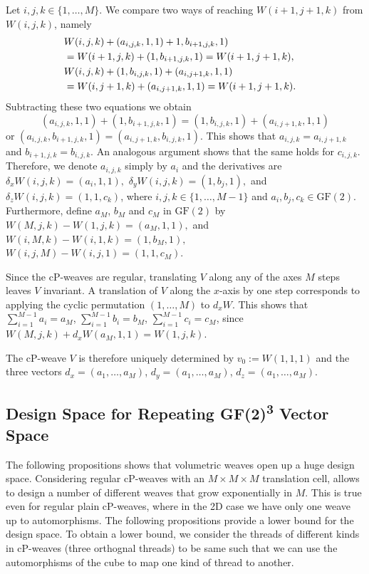 \documentclass[unnumsec,webpdf,contemporary,large]{oup-authoring-template}%
\theoremstyle{thmstyleone}%
\theoremstyle{thmstyletwo}%
\theoremstyle{thmstylethree}%
\newcommand{\GF}{{\mathrm{GF}}}
\begin{document}
Let $i,j,k\in\{1,\ldots, M\}$. We compare two ways of reaching  $W(i+1,j+1,k)$  from $W(i,j,k)$, namely
\begin{eqnarray*}
\lefteqn{W(i,j,k) + (a_{i,j,k},1,1)+ 1,b_{i+1,j,k},1) }\\
&= W(i+1,j,k) + (1,b_{i+1,j,k},1) = W(i+1,j+1,k),\\
\lefteqn{W(i,j,k) + (1,b_{i,j,k},1)+ (a_{i,j+1,k},1,1)}\\
&= W(i,j+1,k)+  (a_{i,j+1,k},1,1) = W(i+1,j+1,k).
\end{eqnarray*}
Subtracting these two equations we obtain 
$$(a_{i,j,k},1,1)+ (1,b_{i+1,j,k},1)  = 
(1,b_{i,j,k},1)+ (a_{i,j+1,k},1,1)$$
or $(a_{i,j,k},b_{i+1,j,k},1)  = (a_{i,j+1,k},b_{i,j,k},1).$
This shows that $a_{i,j,k}=a_{i,j+1,k}$ and $b_{i+1,j,k}=b_{i,j,k}.$ An analogous argument shows that the same holds for $c_{i,j,k}$.
Therefore, we denote $a_{i,j,k}$ simply by $a_i$
and the derivatives are  $\delta_x W(i,j,k) = (a_{i},1,1),$ $\delta_y W(i,j,k) = (1,b_{j},1),$ and $\delta_z W(i,j,k) = (1,1,c_{k})$, where $i,j,k\in \{1,\ldots, M-1\}$ and $a_i,b_j,c_k\in \GF(2)$. Furthermore, define $a_M$, $b_M$ and $c_M$ in $\GF(2)$ by $W(M,j,k) - W(1,j,k)= (a_M,1,1),$ and $W(i,M,k) - W(i,1,k)= (1,b_M,1),$ $W(i,j,M) - W(i,j,1)= (1,1,c_M).$ 


Since the cP-weaves are regular, translating $V$ along any of the axes $M$ steps leaves $V$ invariant. A translation of $V$ along the $x$-axis by one step corresponds to applying the cyclic permutation $(1,\ldots,M)$ to $d_xW$. This shows that $\sum_{i=1}^{M-1} a_i = a_M$, $\sum_{i=1}^{M-1} b_i = b_M$, $\sum_{i=1}^{M-1} c_i = c_M$, since $W(M,j,k) + d_xW(a_M,1,1) = W(1,j,k)$.

The cP-weave $V$ is therefore uniquely determined by $v_0:= W(1,1,1)$ and the three vectors $d_x=(a_1,\ldots,a_M)$, $d_y=(a_1,\ldots,a_M)$, $d_z=(a_1,\ldots,a_M)$.


\subsection{Design Space for Repeating GF(2)\texorpdfstring{\textsuperscript{3}}{} Vector Space}

The following propositions shows that volumetric weaves open up a huge design space. Considering regular cP-weaves with an $M\times M\times M$ translation cell, allows to design a number of different weaves that grow exponentially in $M$. This is true even for regular plain cP-weaves, where in the 2D case we have only one weave up to automorphisms.  The following propositions provide a lower bound for the design space. To obtain a lower bound, we consider the threads of different kinds in cP-weaves (three orthognal threads) to be same such that we can use the automorphisms of the cube to map one kind of  thread to another.
\end{document}

